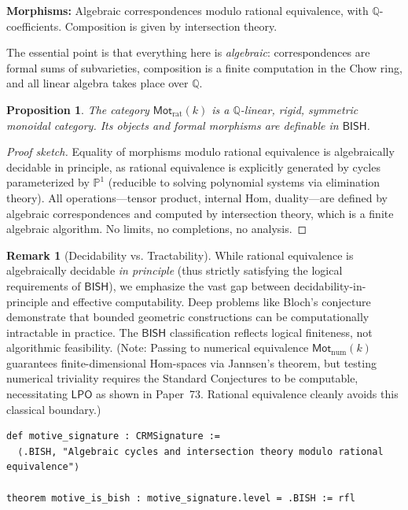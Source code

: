 \documentclass[11pt,a4paper]{article}
\theoremstyle{plain}
\newtheorem{proposition}[theorem]{Proposition}
\theoremstyle{definition}
\newtheorem{remark}[theorem]{Remark}
\newcommand{\BISH}{\textsf{BISH}}
\newcommand{\LPO}{\textsf{LPO}}
\newcommand{\Mot}{\mathsf{Mot}}
\newcommand{\Q}{\mathbb{Q}}
\begin{document}
\textbf{Morphisms:} Algebraic correspondences modulo rational equivalence, with $\Q$-coefficients. Composition is given by intersection theory.

The essential point is that everything here is \emph{algebraic}: correspondences are formal sums of subvarieties, composition is a finite computation in the Chow ring, and all linear algebra takes place over $\Q$.

\begin{proposition}\label{prop:motive-bish}
The category $\Mot_{\mathrm{rat}}(k)$ is a $\Q$-linear, rigid, symmetric monoidal category. Its objects and formal morphisms are definable in $\BISH$.
\end{proposition}

\begin{proof}[Proof sketch]
Equality of morphisms modulo rational equivalence is algebraically decidable in principle, as rational equivalence is explicitly generated by cycles parameterized by $\mathbb{P}^1$ (reducible to solving polynomial systems via elimination theory). All operations---tensor product, internal Hom, duality---are defined by algebraic correspondences and computed by intersection theory, which is a finite algebraic algorithm. No limits, no completions, no analysis.
\end{proof}

\begin{remark}[Decidability vs. Tractability]\label{rmk:decidability}
While rational equivalence is algebraically decidable \emph{in principle} (thus strictly satisfying the logical requirements of $\BISH$), we emphasize the vast gap between decidability-in-principle and effective computability. Deep problems like Bloch's conjecture demonstrate that bounded geometric constructions can be computationally intractable in practice. The $\BISH$ classification reflects logical finiteness, not algorithmic feasibility. (Note: Passing to numerical equivalence $\Mot_{\mathrm{num}}(k)$ guarantees finite-dimensional Hom-spaces via Jannsen's theorem, but testing numerical triviality requires the Standard Conjectures to be computable, necessitating $\LPO$ as shown in Paper~73. Rational equivalence cleanly avoids this classical boundary.)
\end{remark}

\begin{tcolorbox}[leanbox={Lean: Motive signature}]
\begin{Verbatim}[fontsize=\small]
def motive_signature : CRMSignature :=
  ⟨.BISH, "Algebraic cycles and intersection theory modulo rational equivalence"⟩

theorem motive_is_bish : motive_signature.level = .BISH := rfl
\end{Verbatim}
\end{tcolorbox}
\end{document}
